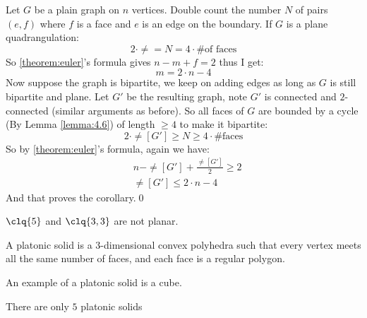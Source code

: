 \begin{prf}
    Let $G$ be a plain graph on $n$ vertices. Double count the number $N$ of pairs $(e, f)$ where $f$ is a face and $e$ is an edge on the boundary. If $G$ is a plane quadrangulation:
    \begin{equation*}
        2 \cdot \ne = N = 4 \cdot \text{\# of faces}
    \end{equation*}
    So \ref{theorem:euler}'s formula gives $n - m + f = 2$ thus I get:
    \begin{equation*}
        m = 2 \cdot n - 4
    \end{equation*}
    Now suppose the graph is bipartite, we keep on adding edges as long as $G$ is still bipartite and plane. Let $G'$ be the resulting graph, note $G'$ is connected and $2$-connected (similar arguments as before). So all faces of $G$ are bounded by a cycle (By Lemma \ref{lemma:4.6}) of length $\geq 4$ to make it bipartite:
    \begin{equation*}
        2 \cdot \ne[G'] \geq N \geq 4 \cdot \text{\# faces}
    \end{equation*}
    So by \ref{theorem:euler}'s formula, again we have:
    \begin{align*}
        &n - \ne[G'] + \frac{\ne[G']}{2} \geq 2 \\
        &\ne[G'] \leq 2 \cdot n - 4
    \end{align*}
    And that proves the corollary.\qed
\end{prf}
\begin{customcorollary}{4.11}
\label{corollary:4.11}
    $\clq{5}$ and $\clq{3, 3}$ are not planar.
\end{customcorollary}
\begin{definition}
    A platonic solid is a $3$-dimensional convex polyhedra such that every vertex meets all the same number of faces, and each face is a regular polygon.
\end{definition}
An example of a platonic solid is a cube.
\begin{customtheorem}{4.12}
\label{theorem:4.12}
    There are only $5$ platonic solids
\end{customtheorem}
